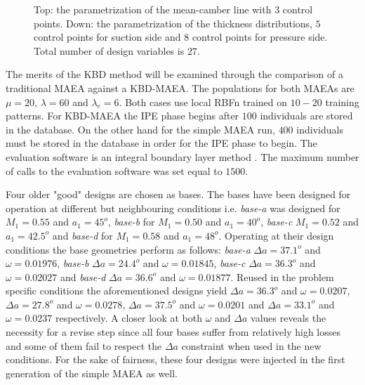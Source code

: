 \begin{figure}[h!]
\begin{minipage}[b]{1\linewidth}
 \centering
\end{minipage}
\caption{Top: the parametrization of the mean-camber line with $3$ control points. Down: the parametrization of the thickness distributions, $5$ control points for suction side and $8$ control points for pressure side. Total number of design variables is $27$.} 
\label{CBRparam}
\end{figure}

The merits of the KBD method will be examined through the comparison of a traditional MAEA against a KBD-MAEA. The populations for both MAEAs are $\mu=20$, $\lambda=60$ and $\lambda_e=6$. Both cases use local RBFn trained on $10-20$ training patterns. For KBD-MAEA the IPE phase begins after $100$ individuals are stored in the database. On the other hand for the simple MAEA run, $400$ individuals must be stored in the database in order for the IPE phase to begin. The evaluation software is an integral boundary layer method \cite{Drel1987}. The maximum number of calls to the evaluation software was set equal to $1500$.              


Four older "good" designs are chosen as bases. The bases have been designed for operation at different but neighbouring conditions i.e. \textit{base-a} was designed for $M_1=0.55$ and $a_1=45^o$, \textit{base-b} for $M_1=0.50$ and $a_1=40^o$, \textit{base-c} $M_1=0.52$ and $a_1=42.5^o$ and \textit{base-d} for $M_1=0.58$ and $a_1=48^o$. Operating at their design conditions the base geometries perform as follows: \textit{base-a} $\Delta a=37.1^o$ and $\omega=0.01976$, \textit{base-b} $\Delta a=24.4^o$ and $\omega=0.01845$, \textit{base-c} $\Delta a=36.3^o$ and $\omega=0.02027$ and \textit{base-d} $\Delta a=36.6^o$ and $\omega=0.01877$. Reused in the problem specific conditions the aforementioned designs yield $\Delta a=36.3^o$ and $\omega=0.0207$, $\Delta a=27.8^o$ and $\omega=0.0278$, $\Delta a=37.5^o$ and $\omega=0.0201$ and $\Delta a=33.1^o$ and $\omega=0.0237$ respectively. A closer look at both $\omega$ and $\Delta a$ values reveals the necessity for a revise step since all four bases suffer from relatively high losses and some of them fail to respect the $\Delta a$ constraint when used in the new conditions. For the sake of fairness, these four designs were injected in the first generation of the simple MAEA as well.  


